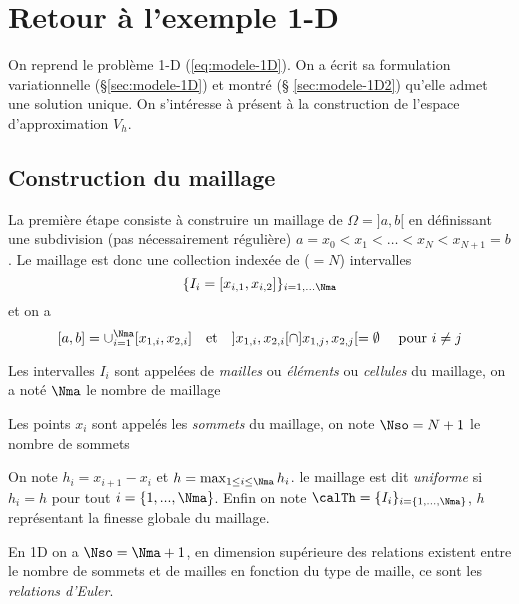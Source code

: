 \section{Retour \`a l'exemple 1-D}
\label{sec:retour-a-lexemple}

%
\noindent
%
On reprend le problème 1-D (\ref{eq:modele-1D}).  On a écrit sa formulation
variationnelle (\cf \S\ref{sec:modele-1D}) et montré (\cf \S
\ref{sec:modele-1D2}) qu'elle admet une solution unique. On s'intéresse à
présent à la construction de l'espace d'approximation $V_h$.

\subsection{Construction du maillage}
\label{sec:constr-du-maill}


La première étape consiste à construire un maillage de $\Omega = ]a,b[$ en définissant une
subdivision (pas nécessairement régulière) $a=x_0 < x_1 < \ldots < x_N <
x_{N+1}=b$. Le maillage est donc une collection indexée de \Nma ($=N$) intervalles
$$\{I_i=[x_{i,1},x_{i,2}]\}_{i=1,...\Nma}$$ et on a
\begin{equation}
  \label{eq:1}
  [a,b]=\cup_{i=1}^\Nma [x_{1,i},x_{2,i}] \quad \mbox{et} \quad
  ]x_{1,i},x_{2,i}[ \cap ]x_{1,j},x_{2,j}[ = \emptyset \quad \mbox{ pour } i
  \neq j
\end{equation}

\begin{definition}
  Les intervalles $I_i$ sont appelées de \emph{mailles} ou \emph{éléments} ou
  \emph{cellules} du maillage, on a noté $\Nma$ le nombre de maillage
\end{definition}
\begin{definition}
  \label{def:23}
  Les points $x_i$ sont appelés les \emph{sommets} du maillage, on
  note $\Nso=N+1$ le nombre de sommets
\end{definition}

On note $h_i = x_{i+1}-x_i$ et $h = \max_{1\leq i \leq \Nma} h_i$. le maillage
est dit \emph{uniforme} si $h_i=h$ pour tout $i=\{1,...,\Nma\}$. Enfin on note
$\calTh=\{I_i\}_{i=\{1,...,\Nma\}}$, $h$ représentant la finesse globale du
maillage.

\begin{remark}
  \label{rem:1}
  En 1D on a $\Nso = \Nma+1$, en dimension supérieure des relations existent
  entre le nombre de sommets et de mailles en fonction du type de maille, ce
  sont les \emph{relations d'Euler}.
\end{remark}


